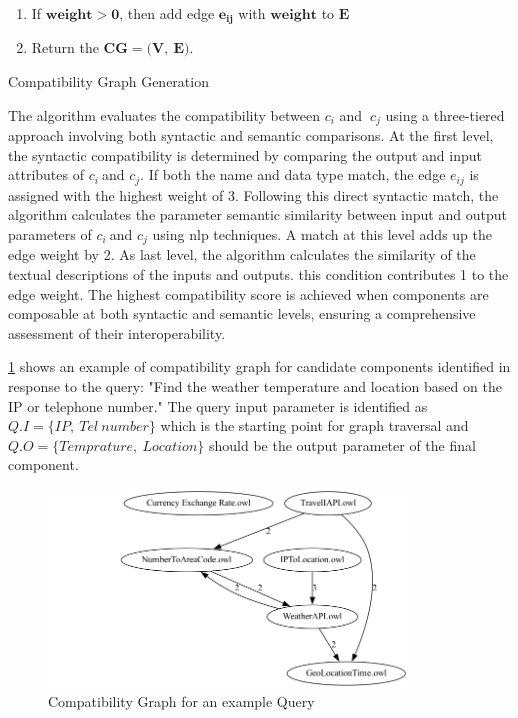 \begin{algorithm}
\begin{enumerate}
	\item 
	If \(\mathbf{weight}\mathbf{> 0}\), then add edge
	  \(\mathbf{e}_{\mathbf{ij}}\) with \(\mathbf{weight}\) to
	  \(\mathbf{E}\)
	  \item 
	  Return the
	    \(\mathbf{CG}\mathbf{= (}\mathbf{V}\mathbf{,\ }\mathbf{E}\mathbf{)}\).
	\end{enumerate}
	
\caption{Compatibility Graph Generation}\label{alg:disc-cg}
\end{algorithm}

The algorithm evaluates the compatibility between \(c_{i}\) and
\(\ c_{j}\) using a three-tiered approach involving both syntactic and
semantic comparisons. At the first level, the syntactic compatibility is
determined by comparing the output and input attributes of
\(c_{i}\ \)and \(c_{j}\). If both the name and data type match, the edge
\(e_{ij}\) is assigned with the highest weight of 3. Following this
direct syntactic match, the algorithm calculates the parameter semantic
similarity between input and output parameters of \(c_{i}\ \)and
\(c_{j}\) using \gls{nlp} techniques. A match at this level adds up the edge
weight by 2. As last level, the algorithm calculates the similarity of
the textual descriptions of the inputs and outputs. this condition
contributes 1 to the edge weight. The highest compatibility score is
achieved when components are composable at both syntactic and semantic
levels, ensuring a comprehensive assessment of their interoperability.

\cref{fig:disco-cg-test} shows an example of compatibility graph for candidate
components identified in response to the query: "Find the weather
temperature and location based on the IP or telephone number." The
query input parameter is identified as \(Q.I = \{ IP,\ Tel\ number\}\)
which is the starting point for graph traversal and
\(Q.O = \{ Temprature,\ Location\}\) should be the output parameter of
the final component.

\begin{figure}[hbt]
\hypertarget{fig:disco-cg-test}{%
\centering
\includegraphics[width=0.85\textwidth]{../figures/MyFigures/test1.png}
\captionsetup{justification=centering}
\caption{Compatibility Graph for an example Query}\label{fig:disco-cg-test}
}
\end{figure}

